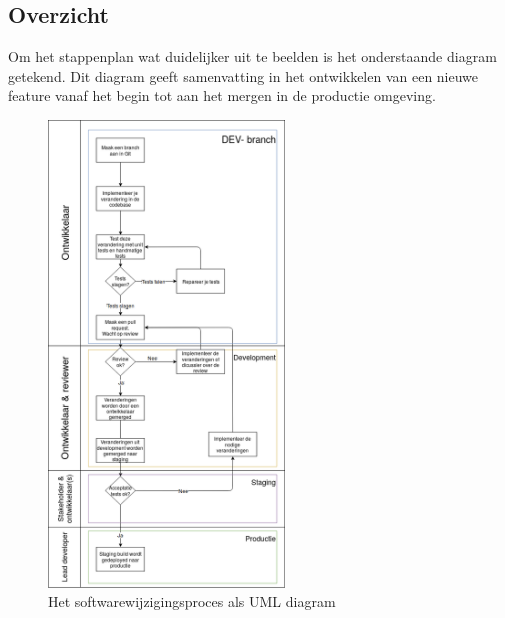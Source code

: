 \subsection{Overzicht}
Om het stappenplan wat duidelijker uit te beelden is het onderstaande diagram getekend. Dit diagram geeft samenvatting in het ontwikkelen van een nieuwe feature vanaf het begin tot aan het mergen in de productie omgeving.
\begin{figure}[h]
	\centering\includegraphics[width=0.56\textwidth]{images/UMLSoftwareChange.png}
	\caption{Het softwarewijzigingsproces als UML diagram}
\end{figure}
